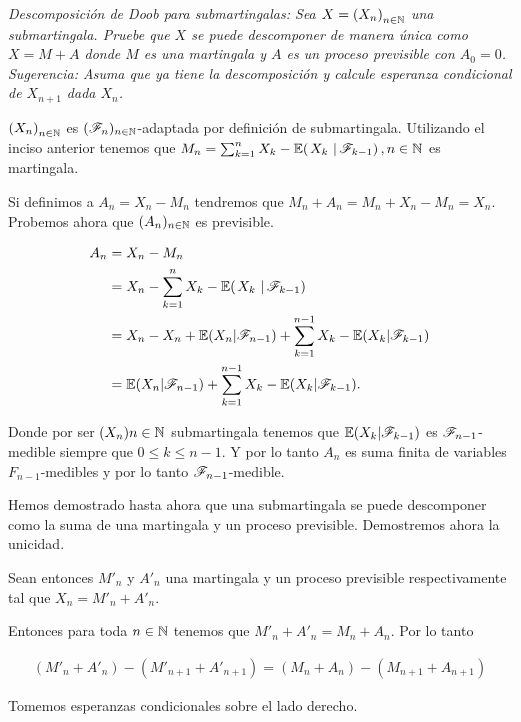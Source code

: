 \emph{
    Descomposici\'on de Doob para submartingalas: Sea $X=\left( X_n\right) _{n\in\mathbb{N}}$ una submartingala. 
    Pruebe que $X$ se puede descomponer de manera \'unica como $X=M+A$ donde $M$ es una martingala y $A$ 
    es un proceso previsible con $A_0=0$. Sugerencia: Asuma que ya tiene la descomposici\'on y calcule 
    esperanza condicional de $X_{n+1}$ dada $X_n$. 
}

\afterstatement\pn

$\left( X_n\right) _{n\in\mathbb{N}}$ es $(\mathscr{F}_n)_{n \in \mathbb{N}}$-adaptada por definición de submartingala. Utilizando el inciso anterior tenemos
que $M_n = \sum_{k=1}^n X_k-\espc{X_k}{\F_{k-1}}, n \in \N$ es martingala.\pn

Si definimos a $A_n = X_n - M_n$ tendremos que $M_n + A_n = M_n + X_n - M_n = X_n$. Probemos ahora que
$(A_n)_{n \in \mathbb{N}}$ es previsible.\pn

\begin{align}
    A_n     &=      X_n - M_n                                                                   \\
            &=      X_n - \sum_{k=1}^n X_k-\espc{X_k}{\F_{k-1}}                                 \\
            &=      X_n - X_n + \E(X_n | \F_{n-1}) + \sum_{k=1}^{n-1} X_k-\E(X_k|\F_{k-1})      \\     
            &=      \E(X_n | \F_{n-1}) + \sum_{k=1}^{n-1} X_k-\E(X_k|\F_{k-1}).     
\end{align}\pn

Donde por ser $(X_n){n \in \mathbb{N}}$ submartingala tenemos que $\mathbb{E}(X_k|\mathscr{F}_{k-1})$ es $\mathscr{F}_{n-1}$-medible siempre que $0 \leq k \leq n-1$.
Y por lo tanto $A_n$ es suma finita de variables $F_{n-1}$-medibles y por lo tanto $\mathscr{F}_{n-1}$-medible.\pn

Hemos demostrado hasta ahora que una submartingala se puede descomponer como la suma de una martingala y un proceso previsible.
Demostremos ahora la unicidad.\pn

Sean entonces $M'_n$ y $A'_n$ una martingala y un proceso previsible respectivamente tal que $X_n = M'_n + A'_n$.\pn

Entonces para toda $n \in \mathbb{N}$ tenemos que $M'_n + A'_n = M_n + A_n$. Por lo tanto 

\begin{align}
    (M'_n + A'_n) - (M'_{n+1} + A'_{n+1}) = (M_n + A_n) - (M_{n+1} + A_{n+1})
\end{align}\pn

Tomemos esperanzas condicionales sobre el lado derecho.

